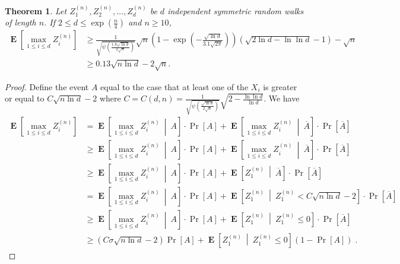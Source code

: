 \documentclass{article}
\DeclareMathOperator*{\Exp}{\mathbf{E}}
\newtheorem{theorem}{Theorem}
\begin{document}
\begin{theorem}
\label{theorem:maximum-of-random-walks}
Let $Z^{(n)}_1, Z^{(n)}_2, \dots, Z^{(n)}_d$ be $d$ independent symmetric random walks of length $n$. If $2 \le d \le \exp(\frac{n}{4})$ and $n\ge 10$,
\begin{align*}
\Exp \left[ \max_{1 \le i \le d} Z^{(n)}_i \right]
& \ge \frac{1}{\sqrt{\psi\left(\frac{1.6\sqrt{\ln d}}{2 \sqrt{n}}\right)}}\sqrt{n}\left(1 - \exp\left(-\frac{\sqrt{\ln d}}{3.1 \sqrt{2\pi}}\right)\right) \left(\sqrt{2 \ln d -\ln \ln d}-1\right) -\sqrt{n} \\
& \ge 0.13 \sqrt{n \ln d} - 2 \sqrt{n}.
\end{align*}
\end{theorem}

\begin{proof}
Define the event $A$ equal to the case that at least one of the $X_i$ is greater or equal to $C \sqrt{n \ln d}-2$ where $C = C(d,n) = \frac{1}{\sqrt{\psi\left(\frac{\sqrt{\ln d}}{2 \sqrt{n}}\right)}}\sqrt{2-\frac{\ln \ln d}{\ln d}}$.
We have
\begin{align*}
\Exp \left[ \max_{1 \le i \le d} Z^{(n)}_i \right]
& = \Exp \left[ \max_{1 \le i \le d} Z^{(n)}_i ~ \middle|~ A \right] \cdot \Pr[A] + \Exp \left[ \max_{1 \le i \le d} Z^{(n)}_i ~\middle|~ \overline{A} \right] \cdot \Pr \left[ \overline{A} \right] \\
& \ge \Exp \left[ \max_{1 \le i \le d} Z^{(n)}_i ~\middle|~ A \right] \cdot \Pr[A] + \Exp \left[ \max_{1 \le i \le d} Z^{(n)}_i ~\middle|~ \overline{A} \right] \cdot \Pr \left[ \overline{A} \right]\\
& \ge \Exp \left[ \max_{1 \le i \le d} Z^{(n)}_i ~\middle|~ A \right] \cdot \Pr[A] + \Exp\left[ Z^{(n)}_1 ~\middle|~ \overline{A} \right] \cdot \Pr \left[ \overline{A} \right] \\
& = \Exp \left[ \max_{1 \le i \le d} Z^{(n)}_i ~\middle|~ A \right] \cdot \Pr[A] + \Exp \left[ Z^{(n)}_1 ~\middle|~ Z^{(n)}_1 < C \sqrt{n \ln d} - 2 \right] \cdot \Pr \left[ \overline{A} \right]\\
& \ge \Exp \left[ \max_{1 \le i \le d} Z^{(n)}_i ~\middle|~ A \right] \cdot \Pr[A] + \Exp \left[ Z^{(n)}_1 ~\middle|~ Z^{(n)}_1 \le 0 \right] \cdot \Pr \left[ \overline{A} \right] \\
& \ge (C \sigma \sqrt{n \ln d} - 2) \Pr[A] + \Exp \left[ Z^{(n)}_1 ~\middle|~ Z^{(n)}_1 \le 0 \right] (1 - \Pr[A]) \; .
\end{align*}


\end{proof}
\end{document}
